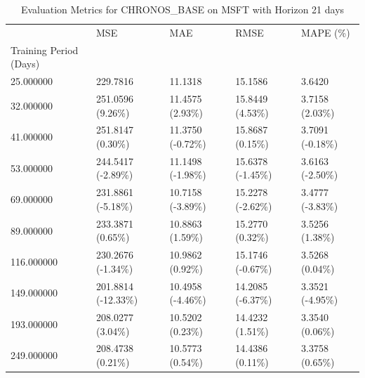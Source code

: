 \begin{table}
\caption{Evaluation Metrics for CHRONOS_BASE on MSFT with Horizon 21 days}
\label{tab:chronos_base_MSFT_h21_metrics}
\begin{tabular}{lllll}
\toprule
 & MSE & MAE & RMSE & MAPE (\%) \\
Training Period (Days) &  &  &  &  \\
\midrule
25.000000 & 229.7816 & 11.1318 & 15.1586 & 3.6420 \\
32.000000 & 251.0596 (9.26\%) & 11.4575 (2.93\%) & 15.8449 (4.53\%) & 3.7158 (2.03\%) \\
41.000000 & 251.8147 (0.30\%) & 11.3750 (-0.72\%) & 15.8687 (0.15\%) & 3.7091 (-0.18\%) \\
53.000000 & 244.5417 (-2.89\%) & 11.1498 (-1.98\%) & 15.6378 (-1.45\%) & 3.6163 (-2.50\%) \\
69.000000 & 231.8861 (-5.18\%) & 10.7158 (-3.89\%) & 15.2278 (-2.62\%) & 3.4777 (-3.83\%) \\
89.000000 & 233.3871 (0.65\%) & 10.8863 (1.59\%) & 15.2770 (0.32\%) & 3.5256 (1.38\%) \\
116.000000 & 230.2676 (-1.34\%) & 10.9862 (0.92\%) & 15.1746 (-0.67\%) & 3.5268 (0.04\%) \\
149.000000 & 201.8814 (-12.33\%) & 10.4958 (-4.46\%) & 14.2085 (-6.37\%) & 3.3521 (-4.95\%) \\
193.000000 & 208.0277 (3.04\%) & 10.5202 (0.23\%) & 14.4232 (1.51\%) & 3.3540 (0.06\%) \\
249.000000 & 208.4738 (0.21\%) & 10.5773 (0.54\%) & 14.4386 (0.11\%) & 3.3758 (0.65\%) \\
\bottomrule
\end{tabular}
\end{table}
